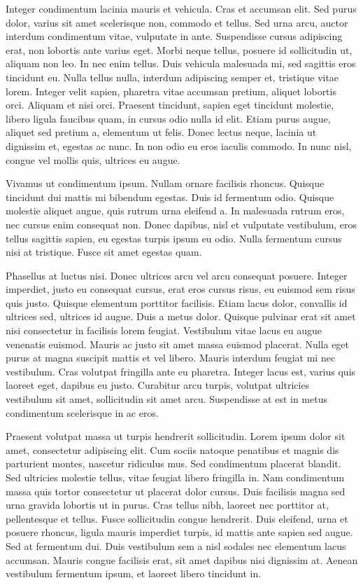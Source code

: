 Integer condimentum lacinia mauris et vehicula. Cras et accumsan
elit. Sed purus dolor, varius sit amet scelerisque non, commodo et
tellus. Sed urna arcu, auctor interdum condimentum vitae, vulputate in
ante. Suspendisse cursus adipiscing erat, non lobortis ante varius
eget. Morbi neque tellus, posuere id sollicitudin ut, aliquam non
leo. In nec enim tellus. Duis vehicula malesuada mi, sed sagittis eros
tincidunt eu. Nulla tellus nulla, interdum adipiscing semper et,
tristique vitae lorem. Integer velit sapien, pharetra vitae accumsan
pretium, aliquet lobortis orci. Aliquam et nisi orci. Praesent
tincidunt, sapien eget tincidunt molestie, libero ligula faucibus
quam, in cursus odio nulla id elit. Etiam purus augue, aliquet sed
pretium a, elementum ut felis. Donec lectus neque, lacinia ut
dignissim et, egestas ac nunc. In non odio eu eros iaculis commodo. In
nunc nisl, congue vel mollis quis, ultrices eu augue.

Vivamus ut condimentum ipsum. Nullam ornare facilisis rhoncus. Quisque
tincidunt dui mattis mi bibendum egestas. Duis id fermentum
odio. Quisque molestie aliquet augue, quis rutrum urna eleifend a. In
malesuada rutrum eros, nec cursus enim consequat non. Donec dapibus,
nisl et vulputate vestibulum, eros tellus sagittis sapien, eu egestas
turpis ipsum eu odio. Nulla fermentum cursus nisi at tristique. Fusce
sit amet egestas quam.

Phasellus at luctus nisi. Donec ultrices arcu vel arcu consequat
posuere. Integer imperdiet, justo eu consequat cursus, erat eros
cursus risus, eu euismod sem risus quis justo. Quisque elementum
porttitor facilisis. Etiam lacus dolor, convallis id ultrices sed,
ultrices id augue. Duis a metus dolor. Quisque pulvinar erat sit amet
nisi consectetur in facilisis lorem feugiat. Vestibulum vitae lacus eu
augue venenatis euismod. Mauris ac justo sit amet massa euismod
placerat. Nulla eget purus at magna suscipit mattis et vel
libero. Mauris interdum feugiat mi nec vestibulum. Cras volutpat
fringilla ante eu pharetra. Integer lacus est, varius quis laoreet
eget, dapibus eu justo. Curabitur arcu turpis, volutpat ultricies
vestibulum sit amet, sollicitudin sit amet arcu. Suspendisse at est in
metus condimentum scelerisque in ac eros.

Praesent volutpat massa ut turpis hendrerit sollicitudin. Lorem ipsum
dolor sit amet, consectetur adipiscing elit. Cum sociis natoque
penatibus et magnis dis parturient montes, nascetur ridiculus mus. Sed
condimentum placerat blandit. Sed ultricies molestie tellus, vitae
feugiat libero fringilla in. Nam condimentum massa quis tortor
consectetur ut placerat dolor cursus. Duis facilisis magna sed urna
gravida lobortis ut in purus. Cras tellus nibh, laoreet nec porttitor
at, pellentesque et tellus. Fusce sollicitudin congue hendrerit. Duis
eleifend, urna et posuere rhoncus, ligula mauris imperdiet turpis, id
mattis ante sapien sed augue. Sed at fermentum dui. Duis vestibulum
sem a nisl sodales nec elementum lacus accumsan. Mauris congue
facilisis erat, sit amet dapibus nisi dignissim at. Aenean vestibulum
fermentum ipsum, et laoreet libero tincidunt in.

